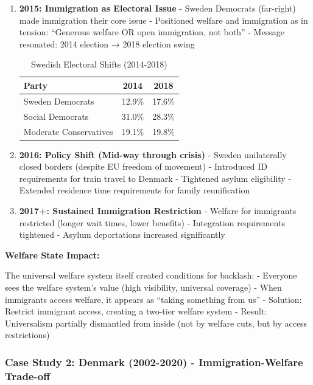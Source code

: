 \begin{enumerate}

\item \textbf{2015: Immigration as Electoral Issue}
   - Sweden Democrats (far-right) made immigration their core issue
   - Positioned welfare and immigration as in tension: ``Generous welfare OR open immigration, not both''
   - Message resonated: 2014 election → 2018 election swing

   \begin{table}[h]
   \centering
   \caption{Swedish Electoral Shifts (2014-2018)}
   \label{tab:sweden-election}
   \begin{tabular}{lcc}
   \toprule
   \textbf{Party} & \textbf{2014} & \textbf{2018} \\
   \midrule
   Sweden Democrats & 12.9\% & 17.6\% \\
   Social Democrats & 31.0\% & 28.3\% \\
   Moderate Conservatives & 19.1\% & 19.8\% \\
   \bottomrule
   \end{tabular}
   \end{table}

\item \textbf{2016: Policy Shift (Mid-way through crisis)}
   - Sweden unilaterally closed borders (despite EU freedom of movement)
   - Introduced ID requirements for train travel to Denmark
   - Tightened asylum eligibility
   - Extended residence time requirements for family reunification

\item \textbf{2017+: Sustained Immigration Restriction}
   - Welfare for immigrants restricted (longer wait times, lower benefits)
   - Integration requirements tightened
   - Asylum deportations increased significantly

\end{enumerate}

\textbf{Welfare State Impact:}

The universal welfare system itself created conditions for backlash:
- Everyone sees the welfare system's value (high visibility, universal coverage)
- When immigrants access welfare, it appears as ``taking something from us''
- Solution: Restrict immigrant access, creating a two-tier welfare system
- Result: Universalism partially dismantled from inside (not by welfare cuts, but by access restrictions)

\subsubsection{Case Study 2: Denmark (2002-2020) - Immigration-Welfare Trade-off}

